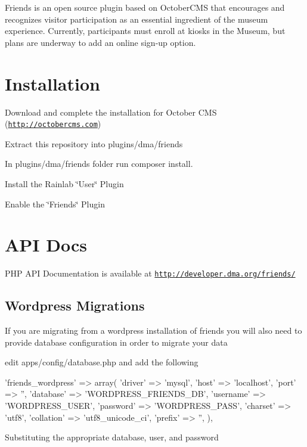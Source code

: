 Friends is an open source plugin based on October\-C\-M\-S that encourages and recognizes visitor participation as an essential ingredient of the museum experience. Currently, participants must enroll at kiosks in the Museum, but plans are underway to add an online sign-\/up option.

\section*{Installation}


\begin{DoxyItemize}
\item Download and complete the installation for October C\-M\-S (\href{http://octobercms.com}{\tt http\-://octobercms.\-com})
\item Extract this repository into plugins/dma/friends
\item In plugins/dma/friends folder run {\ttfamily composer install}.
\item Install the Rainlab \char`\"{}\-User\char`\"{} Plugin
\item Enable the \char`\"{}\-Friends\char`\"{} Plugin
\end{DoxyItemize}

\section*{A\-P\-I Docs}

P\-H\-P A\-P\-I Documentation is available at \href{http://developer.dma.org/friends/}{\tt http\-://developer.\-dma.\-org/friends/}

\subsection*{Wordpress Migrations}

If you are migrating from a wordpress installation of friends you will also need to provide database configuration in order to migrate your data


\begin{DoxyItemize}
\item edit apps/config/database.\-php and add the following 
\begin{DoxyPre}
        'friends\_wordpress' => array(
            'driver'    => 'mysql',
            'host'      => 'localhost',
            'port'      => '', 
            'database'  => 'WORDPRESS\_FRIENDS\_DB',
            'username'  => 'WORDPRESS\_USER',
            'password'  => 'WORDPRESS\_PASS',
            'charset'   => 'utf8',
            'collation' => 'utf8\_unicode\_ci',
            'prefix'    => '', 
        ), 
\end{DoxyPre}
 Substituting the appropriate database, user, and password 
\end{DoxyItemize}
